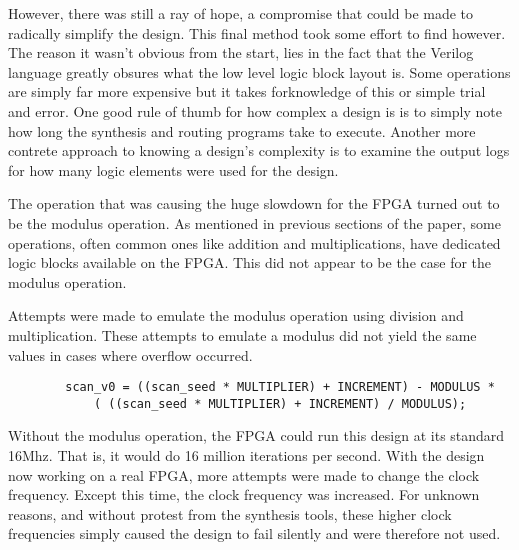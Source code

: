 \documentclass{article}
\begin{document}
    However, there was still a ray of hope, a compromise that could be made
    to radically simplify the design.
    This final method took some effort to find however. The reason
    it wasn't obvious from the start, lies in the fact that
    the Verilog language greatly obsures what the low level logic block
    layout is.
    Some operations are simply far more expensive but it takes forknowledge of
    this or simple trial and error.
    One good rule of thumb for how complex a design is is to simply
    note how long the synthesis and routing programs take to execute.
    Another more contrete approach to knowing a design's complexity
    is to examine the output logs for how many logic elements were
    used for the design.

    The operation that was causing the huge slowdown for the FPGA turned
    out to be the modulus operation.
    As mentioned in previous sections of the paper, some operations,
    often common ones like addition and multiplications, have dedicated
    logic blocks available on the FPGA.
    This did not appear to be the case for the modulus operation.

    Attempts were made to emulate the modulus operation using division
    and multiplication. These attempts to emulate a modulus did not
    yield the same values in cases where overflow occurred.

    \lstset{language=Verilog}

    \begin{lstlisting}
        scan_v0 = ((scan_seed * MULTIPLIER) + INCREMENT) - MODULUS *
            ( ((scan_seed * MULTIPLIER) + INCREMENT) / MODULUS);
    \end{lstlisting}   
    

    Without the modulus operation, the FPGA could run this design at its
    standard 16Mhz. That is, it would do 16 million iterations per second.
    With the design now working on a real FPGA, more attempts were made
    to change the clock frequency. Except this time, the clock frequency was increased.
    For unknown reasons, and without protest from the synthesis tools,
    these higher clock frequencies simply caused the design to fail
    silently and were therefore not used.

    \lstset{language=Verilog}
\end{document}
